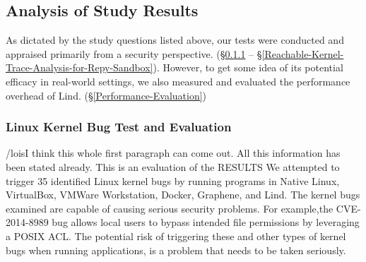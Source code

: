 \subsection{Analysis of Study Results}

As dictated by the study questions listed above, our tests were conducted
and appraised primarily from a security perspective.
(\S{\ref{Linux-Kernel-Bug-Test-and-Evaluation}} --
\S{\ref{Reachable-Kernel-Trace-Analysis-for-Repy-Sandbox}}).
However, to get some idea of its potential efficacy
in real-world settings, we also measured and evaluated the performance
overhead of Lind.
(\S{\ref{Performance-Evaluation}})

\subsubsection{Linux Kernel Bug Test and Evaluation}
\label{Linux-Kernel-Bug-Test-and-Evaluation}

/lois{I think this whole first paragraph can come out. All this information has
 been stated already. This is an evaluation of the RESULTS} We attempted to
trigger 35 identified Linux kernel bugs by running programs in
Native Linux, VirtualBox, VMWare Workstation, Docker, Graphene,
and Lind.
The kernel bugs examined are capable of causing serious security problems.
For example,the CVE-2014-8989 bug allows local users to bypass intended file
permissions by leveraging a POSIX ACL.
The potential risk of triggering these and other types of
kernel bugs when running applications, is a problem that
needs to be taken seriously.



